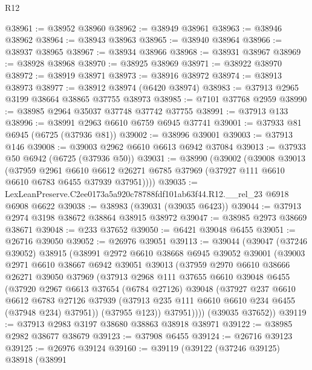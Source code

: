 \begin{lexlean}{R12}
\begin{coremodule}
@38961 := @38952 @38960
@38962 := @38949 @38961
@38963 := @38946 @38962
@38964 := @38943 @38963
@38965 := @38940 @38964
@38966 := @38937 @38965
@38967 := @38934 @38966
@38968 := @38931 @38967
@38969 := @38928 @38968
@38970 := @38925 @38969
@38971 := @38922 @38970
@38972 := @38919 @38971
@38973 := @38916 @38972
@38974 := @38913 @38973
@38977 := @38912 @38974 (@6420 @38974)
@38983 := @37913 @2965 @3199 @38664 @38865 @37755 @38973
@38985 := @7101 @37768 @2959
@38990 := @38985 @2964 @35037 @37748 @37742 @37755
@38991 := @37913 @133
@38996 := @38991 @2963 @6610 @6759 @6945 @37741
@39001 := @37933 @81 @6945 (@6725 (@37936 @81))
@39002 := @38996 @39001
@39003 := @37913 @146
@39008 := @39003 @2962 @6610 @6613 @6942 @37084
@39013 := @37933 @50 @6942 (@6725 (@37936 @50))
@39031 := @38990
    (@39002
      (@39008
        @39013
        (@37959
          @2961
          @6610
          @6612
          @26271
          @6785
          @37969
          (@37927 @111 @6610 @6610 @6783 @6455 @37939 @37951))))
@39035 := LexLeanPreserve.C2ee0173a5a920c78788fdf101ab63f44.R12.__rel_23 @6918 @6908 @6622
@39038 := @38983 (@39031 (@39035 @6423))
@39044 := @37913 @2974 @3198 @38672 @38864 @38915 @38972
@39047 := @38985 @2973 @38669 @38671
@39048 := @233 @37652
@39050 := @6421 @39048 @6455
@39051 := @26716 @39050
@39052 := @26976 @39051
@39113 := @39044
    (@39047
      (@37246 @39052)
      @38915
      (@38991
        @2972
        @6610
        @38668
        @6945
        @39052
        @39001
        (@39003
          @2971
          @6610
          @38667
          @6942
          @39051
          @39013
          (@37959
            @2970
            @6610
            @38666
            @26271
            @39050
            @37969
            (@37913
              @2968
              @111
              @37655
              @6610
              @39048
              @6455
              (@37920
                @2967
                @6613
                @37654
                (@6784 @27126)
                @39048
                (@37927
                  @237
                  @6610
                  @6612
                  @6783
                  @27126
                  @37939
                  (@37913 @235 @111 @6610 @6610 @234 @6455 (@37948 @234) @37951))
                (@37955 @123))
              @37951))))
      (@39035 @37652))
@39119 := @37913 @2983 @3197 @38680 @38863 @38918 @38971
@39122 := @38985 @2982 @38677 @38679
@39123 := @37908 @6455
@39124 := @26716 @39123
@39125 := @26976 @39124
@39160 := @39119
    (@39122
      (@37246 @39125)
      @38918
      (@38991

\end{coremodule}
\end{lexlean}
